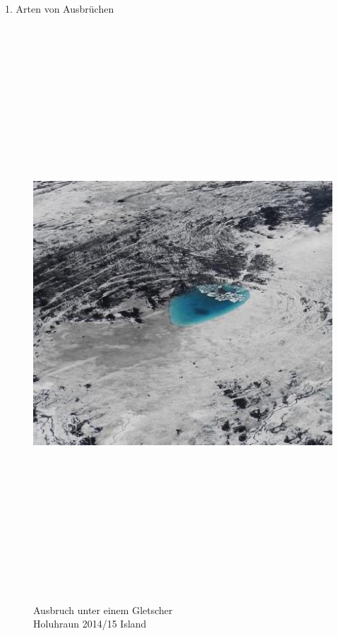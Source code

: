 \documentclass[xcolor=dvipsnames]{beamer}
\begin{document}
\begin{frame}[t]{}
\begin{block}{\LARGE 1. Arten von Ausbrüchen}
\begin{minipage}[t]{0.28\textwidth}
\begin{figure}
    \includegraphics[width=26.5cm, height=21.5cm]{images/2.jpg}
    \caption{\Large Ausbruch unter einem Gletscher\\ Holuhraun 2014/15 Island}
     \end{figure}
     \end{minipage}
    \hfill
  \begin{minipage}[t]{0.3\textwidth}
    \begin{figure}
    \raggedleft
    \captionsetup{justification=centering}

\end{figure}
\end{minipage}
\end{block}
\end{frame}
\end{document}
